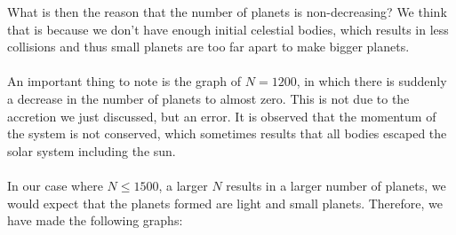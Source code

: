 What is then the reason that the number of planets is non-decreasing? We think that is because we don't have enough initial celestial bodies, which results in less collisions and thus small planets are too far apart to make bigger planets.\\
\\
An important thing to note is the graph of $N=1200$, in which there is suddenly a decrease in the number of planets to almost zero. This is not due to the accretion we just discussed, but an error. It is observed that the momentum of the system is not conserved, which sometimes results that all bodies escaped the solar system including the sun.\\
\\
In our case where $N\leq 1500$, a larger $N$ results in a larger number of planets, we would expect that the planets formed are light and small planets. Therefore, we have made the following graphs:
